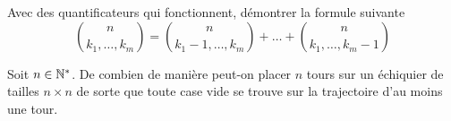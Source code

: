 \documentclass[french]{report}
\begin{document}
\begin{exo}
    Avec des quantificateurs qui fonctionnent, démontrer la formule suivante
    \[\binom{n}{k_1,\dots,k_m}=\binom{n}{k_1-1,\dots,k_m}+\dots+\binom{n}{k_1,\dots,k_m-1}\]
\end{exo}

\begin{exo}
    Soit \(n\in\mathbb{N}^*\). De combien de manière peut-on placer \(n\) tours sur un échiquier
    de tailles \(n\times n\) de sorte que toute case vide se trouve sur la trajectoire
    d'au moins une tour.
\end{exo}
\end{document}
